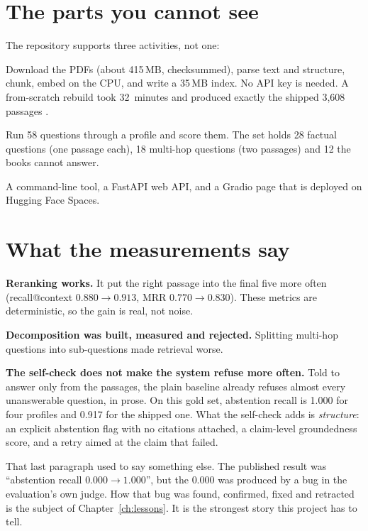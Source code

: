 \section{The parts you cannot see}

The repository supports three activities, not one:
\begin{description}[style=nextline]
  \item[Ingestion --- once, offline, free.] Download the PDFs (about 415\,MB, checksummed), parse text and structure, chunk, embed on the CPU, and write a 35\,MB index. No API key is needed. A from-scratch rebuild took 32~minutes and produced exactly the shipped 3,608 passages \tagM.
  \item[Evaluation --- occasionally.] Run 58 questions through a profile and score them. The set holds 28 factual questions (one passage each), 18 multi-hop questions (two passages) and 12 the books cannot answer.
  \item[Serving --- on demand.] A command-line tool, a FastAPI web API, and a Gradio page that is deployed on Hugging Face Spaces.
\end{description}

\section{What the measurements say}

\begin{keyidea}
\textbf{Reranking works.} It put the right passage into the final five more often (recall@context $0.880\rightarrow0.913$, MRR $0.770\rightarrow0.830$). These metrics are deterministic, so the gain is real, not noise.

\textbf{Decomposition was built, measured and rejected.} Splitting multi-hop questions into sub-questions made retrieval worse.

\textbf{The self-check does not make the system refuse more often.} Told to answer only from the passages, the plain baseline already refuses almost every unanswerable question, in prose. On this gold set, abstention recall is 1.000 for four profiles and 0.917 for the shipped one. What the self-check adds is \emph{structure}: an explicit abstention flag with no citations attached, a claim-level groundedness score, and a retry aimed at the claim that failed.
\end{keyidea}

That last paragraph used to say something else. The published result was ``abstention recall $0.000 \rightarrow 1.000$'', but the $0.000$ was produced by a bug in the evaluation's own judge. How that bug was found, confirmed, fixed and retracted is the subject of Chapter~\ref{ch:lessons}. It is the strongest story this project has to tell.
